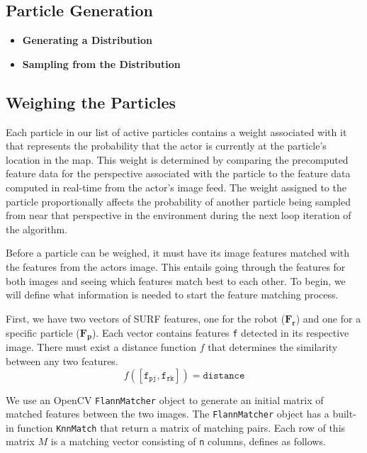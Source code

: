 \documentclass[a4paper,11pt]{article}
\begin{document}
\subsection{Particle Generation}
\begin{itemize}
  \item \textbf{Generating a Distribution}
  \item \textbf{Sampling from the Distribution}
\end{itemize}

\subsection{Weighing the Particles}
Each particle in our list of active particles contains a weight associated with it that represents the probability that the actor is currently at the particle's location in the map. This weight is determined by comparing the precomputed feature data for the perspective associated with the particle to the feature data computed in real-time from the actor's image feed. The weight assigned to the particle proportionally affects the probability of another particle being sampled from near that perspective in the environment during the next loop iteration of the algorithm.

Before a particle can be weighed, it must have its image features matched with the features from the actors image. This entails going through the features for both images and seeing which features match best to each other. To begin, we will define what information is needed to start the feature matching process. 

First, we have two vectors of SURF features, one for the robot ($\boldsymbol{F_r }$) and one for a specific particle ($\boldsymbol{F_p}$). Each vector contains features \verb.f. detected in its respective image. There must exist a distance function $f$ that determines the similarity between any two features. 
 \[ f(\mathtt{[f_{pj}, f_{rk}]}) = \mathtt{distance}\]

   We use an OpenCV \texttt{FlannMatcher} object to generate an initial matrix of matched features between the two images. The \texttt{FlannMatcher} object has a built-in function \texttt{KnnMatch} that return a matrix of matching pairs. Each row of this matrix $M$ is a matching vector consisting of \texttt{n} columns, defines as follows.
\end{document}
